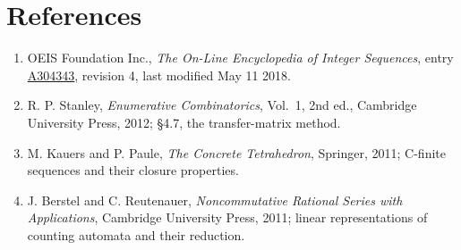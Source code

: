 \documentclass[11pt]{article}
\theoremstyle{definition}
\begin{document}
\section{References}

\begin{enumerate}

\item OEIS Foundation Inc., \emph{The On-Line Encyclopedia of Integer Sequences}, entry \href{https://oeis.org/A304343}{A304343}, revision 4, last modified May 11 2018.

\item R. P. Stanley, \emph{Enumerative Combinatorics}, Vol.~1, 2nd ed., Cambridge University Press, 2012; \S4.7, the transfer-matrix method.

\item M. Kauers and P. Paule, \emph{The Concrete Tetrahedron}, Springer, 2011; C-finite sequences and their closure properties.

\item J. Berstel and C. Reutenauer, \emph{Noncommutative Rational Series with Applications}, Cambridge University Press, 2011; linear representations of counting automata and their reduction.

\end{enumerate}
\end{document}
